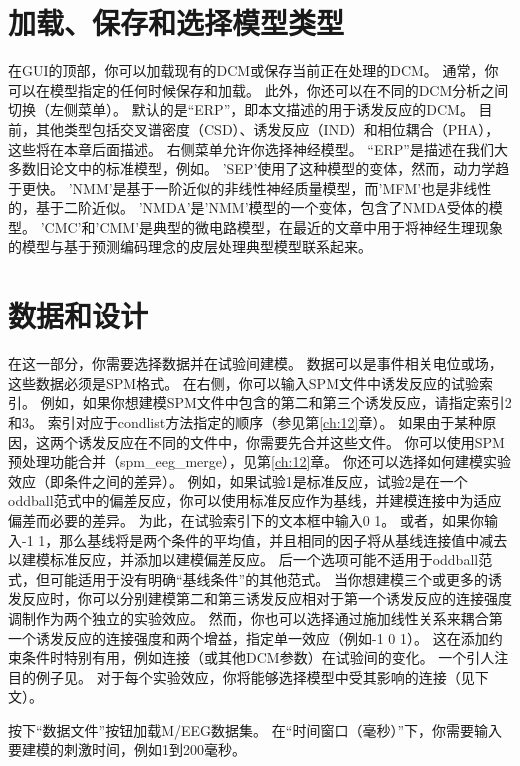 \section{加载、保存和选择模型类型}

在GUI的顶部，你可以加载现有的DCM或保存当前正在处理的DCM。
通常，你可以在模型指定的任何时候保存和加载。
此外，你还可以在不同的DCM分析之间切换（左侧菜单）。
默认的是“ERP”，即本文描述的用于诱发反应的DCM。
目前，其他类型包括交叉谱密度（CSD）、诱发反应（IND）和相位耦合（PHA），这些将在本章后面描述。
右侧菜单允许你选择神经模型。
“ERP”是描述在我们大多数旧论文中的标准模型，例如\cite{u29}。
'SEP'使用了这种模型的变体，然而，动力学趋于更快\cite{u84}。
'NMM'是基于一阶近似的非线性神经质量模型，而'MFM'也是非线性的，基于二阶近似。
'NMDA'是'NMM'模型的一个变体，包含了NMDA受体的模型。
'CMC'和'CMM'是典型的微电路模型\cite{u16}，在最近的文章中用于将神经生理现象的模型与基于预测编码理念的皮层处理典型模型联系起来。


\section{数据和设计}

在这一部分，你需要选择数据并在试验间建模。
数据可以是事件相关电位或场，这些数据必须是SPM格式。
在右侧，你可以输入SPM文件中诱发反应的试验索引。
例如，如果你想建模SPM文件中包含的第二和第三个诱发反应，请指定索引2和3。
索引对应于condlist方法指定的顺序（参见第\ref{ch:12}章）。
如果由于某种原因，这两个诱发反应在不同的文件中，你需要先合并这些文件。
你可以使用SPM预处理功能合并（spm\_eeg\_merge），见第\ref{ch:12}章。
你还可以选择如何建模实验效应（即条件之间的差异）。
例如，如果试验1是标准反应，试验2是在一个oddball范式中的偏差反应，你可以使用标准反应作为基线，并建模连接中为适应偏差而必要的差异。
为此，在试验索引下的文本框中输入0 1。
或者，如果你输入-1 1，那么基线将是两个条件的平均值，并且相同的因子将从基线连接值中减去以建模标准反应，并添加以建模偏差反应。
后一个选项可能不适用于oddball范式，但可能适用于没有明确“基线条件”的其他范式。
当你想建模三个或更多的诱发反应时，你可以分别建模第二和第三诱发反应相对于第一个诱发反应的连接强度调制作为两个独立的实验效应。
然而，你也可以选择通过施加线性关系来耦合第一个诱发反应的连接强度和两个增益，指定单一效应（例如-1 0 1）。
这在添加约束条件时特别有用，例如连接（或其他DCM参数）在试验间的变化。
一个引人注目的例子见\cite{u54}。
对于每个实验效应，你将能够选择模型中受其影响的连接（见下文）。

按下“数据文件”按钮加载M/EEG数据集。
在“时间窗口（毫秒）”下，你需要输入要建模的刺激时间，例如1到200毫秒。


